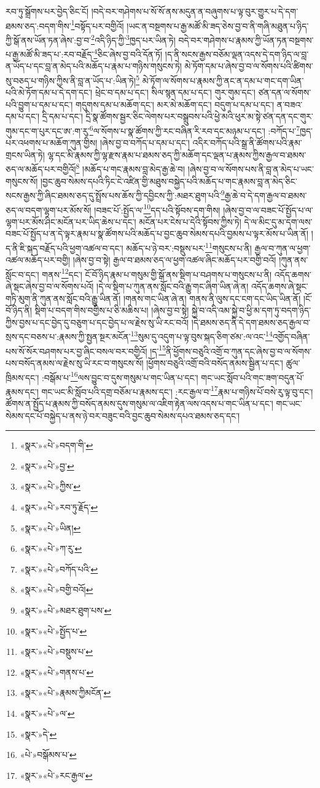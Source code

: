 རབ་ཏུ་སྒྲོགས་པར་བྱེད་ཅིང་ངོ། །བདེ་བར་གཤེགས་པ་སོ་སོ་ནས་མདུན་ན་བཞུགས་པ་ལྟ་བུར་གྱུར་པ་དེ་དག་ཐམས་ཅད་:བདག་གིས་\footnote{«སྣར་»«པེ་»བདག་གི་}བསྟོད་པར་བགྱིའོ། །ཡང་ན་བསྔགས་པ་རྒྱ་མཚོ་མི་ཟད་ཅེས་བྱ་བ་ནི་གཞི་མཐུན་པ་ཉིད་ཀྱི་སྒོ་ནས་ཡོན་ཏན་ཞེས་:བྱ་བ་\footnote{«སྣར་»«པེ་»བྱ་}འདི་ཉིད་ཀྱི་\footnote{«སྣར་»«པེ་»ཀྱིས་}ཁྱད་པར་ཡིན་ཏེ། བདེ་བར་གཤེགས་པ་རྣམས་ཀྱི་ཡོན་ཏན་བསྔགས་པ་རྒྱ་མཚོ་མི་ཟད་པ་:རབ་བརྗོད་\footnote{«སྣར་»«པེ་»རབ་ཏུ་རྗོད་}ཅིང་ཞེས་བྱ་བའི་དོན་ཏོ། །ད་ནི་སངས་རྒྱས་བཅོམ་ལྡན་འདས་དེ་དག་ཉིད་ལ་བླ་ན་ཡོད་པ་དང་བླ་ན་མེད་པའི་མཆོད་པ་རྣམ་པ་གཉིས་གསུངས་ཏེ། མེ་ཏོག་དམ་པ་ཞེས་བྱ་བ་ལ་སོགས་པའི་ཚིགས་སུ་བཅད་པ་གཉིས་ཀྱིས་ནི་བླ་ན་ཡོད་པ་:ཡིན་ཏེ།\footnote{«སྣར་»«པེ་»ཡིན།} མེ་ཏོག་ལ་སོགས་པ་རྣམས་ཀྱི་ནང་ན་དམ་པ་གང་དག་ཡིན་པའི་མེ་ཏོག་དམ་པ་དེ་དག་དང་། ཕྲེང་བ་དམ་པ་དང་། སིལ་སྙན་དམ་པ་དང་། གུར་གུམ་དང་། ཙན་དན་ལ་སོགས་པའི་བྱུག་པ་དམ་པ་དང་། གདུགས་དམ་པ་མཆོག་དང་། མར་མེ་མཆོག་དང་། བདུག་པ་དམ་པ་དང་། ན་བཟའ་དམ་པ་དང་། དྲི་དམ་པ་དང་། དྲི་སྣ་ཚོགས་སྦྱར་ཅིང་ལེགས་པར་བསྒྲུབས་པའི་ཕྱེ་མའི་ཕུར་མ་སྟེ་ཙན་དན་དང་གུར་གུམ་དང་ག་པུར་དང་ཨ་:ག་རུ་\footnote{«སྣར་»«པེ་»ཀ་རུ་}ལ་སོགས་པ་སྣ་ཚོགས་ཀྱི་རང་བཞིན་རི་རབ་དང་མཉམ་པ་དང་། :བཀོད་པ་\footnote{«སྣར་»«པེ་»བཀོད་པའི་}ཁྱད་པར་འཕགས་པ་མཆོག་ཀུན་གྱིས། །ཞེས་བྱ་བ་བཀོད་པ་དམ་པ་དང་། འདིར་བཀོད་པའི་སྒྲ་ནི་ཚོགས་པའི་རྣམ་གྲངས་ཡིན་ཏེ། ལྷ་དང་མི་རྣམས་ཀྱི་ལྷ་རྫས་རྣམ་པ་ཐམས་ཅད་ཀྱི་མཆོག་དང་ལྡན་པ་རྣམས་ཀྱིས་རྒྱལ་བ་ཐམས་ཅད་ལ་མཆོད་པར་བགྱིའོ།\footnote{«སྣར་»«པེ་»བགྱི་བའོ།} །མཆོད་པ་གང་རྣམས་བླ་མེད་རྒྱ་ཆེ་བ། །ཞེས་བྱ་བ་ལ་སོགས་པས་ནི་བླ་ན་མེད་པ་ཡང་གསུངས་སོ། །བྱང་ཆུབ་སེམས་དཔའི་ཏིང་ངེ་འཛིན་གྱི་མཐུས་བསྐྱེད་པའི་མཆོད་པ་གང་རྣམས་བླ་ན་མེད་ཅིང་སངས་རྒྱས་ཀྱི་ཞིང་ཐམས་ཅད་དུ་སྤྲོས་པས་ཆོས་ཀྱི་དབྱིངས་ཀྱི་:མཐར་ཐུག་པའི་\footnote{«སྣར་»«པེ་»མཐར་ཐུག་པས་}རྒྱ་ཆེ་བ་དེ་དག་རྒྱལ་བ་ཐམས་ཅད་ལ་བདག་ལྷག་པར་མོས་སོ། །བཟང་པོ་:སྤྱོད་ལ་\footnote{«སྣར་»«པེ་»སྤྱོད་པ་}དད་པའི་སྟོབས་དག་གིས། །ཞེས་བྱ་བ་ལ་བཟང་པོ་སྤྱོད་པ་ལ་ལྷག་པར་མོས་ཤིང་མངོན་པར་ཡིད་ཆེས་པ་དང་། མངོན་པར་ངེས་པ་དེའི་སྟོབས་ཀྱིས་ཏེ། དེ་ལ་མིང་དུ་མ་དག་ལས་བཟང་པོ་སྤྱོད་པ་ན་དེ་ལྟར་རྣམ་པ་སྣ་ཚོགས་པའི་མཆོད་པ་བྱང་ཆུབ་སེམས་དཔའི་བྱམས་པ་ལྟར་མོས་པ་ཡིན་ནོ། །ད་ནི་ཇི་སྐད་བརྗོད་པའི་ཕྱག་འཚལ་བ་དང་། མཆོད་པ་ཉེ་བར་:བསྡུས་པར་\footnote{«སྣར་»«པེ་»བསྡུས་པ་}གསུངས་པ་ནི། རྒྱལ་བ་ཀུན་ལ་ཕྱག་འཚལ་མཆོད་པར་བགྱི། །ཞེས་བྱ་བ་སྟེ། རྒྱལ་བ་ཐམས་ཅད་ལ་ཕྱག་འཚལ་ཞིང་མཆོད་པར་བགྱི་བའོ། །ཀུན་ནས་སློང་བ་དང་། གནས་\footnote{«སྣར་»«པེ་»གནས་པ་}དང་། ངོ་བོ་ཉིད་རྣམ་པ་གསུམ་གྱི་སྒོ་ནས་སྡིག་པ་བཤགས་པ་གསུངས་པ་ནི། འདོད་ཆགས་ཞེ་སྡང་ཞེས་བྱ་བ་ལ་སོགས་པའོ། །དེ་ལ་སྡིག་པ་ཀུན་ནས་སློང་བའི་རྒྱུ་གང་ཞིག་ཡིན་ཞེ་ན། འདོད་ཆགས་ཞེ་སྡང་གཏི་མུག་ནི་ཀུན་ནས་སློང་བའི་རྒྱུ་ཡིན་ནོ། །གནས་གང་ཡིན་ཞེ་ན། གནས་ནི་ལུས་དང་ངག་དང་ཡིད་ཡིན་ནོ། །ངོ་བོ་ཉིད་ནི། སྡིག་པ་བདག་གིས་བགྱིས་པ་ཅི་མཆིས་པ། །ཞེས་བྱ་བ་སྟེ། སྐྱེ་བ་འདི་འམ་སྐྱེ་བ་ཕྱི་མ་དག་ཏུ་བདག་ཉིད་ཀྱིས་བྱས་པ་དང་བྱེད་དུ་བཅུག་པ་དང་བྱེད་པ་ལ་རྗེས་སུ་ཡི་རང་བའོ། །དེ་ཐམས་ཅད་ནི་དེ་དག་ཐམས་ཅད་རྒྱལ་བ་སྲས་དང་བཅས་པ་:རྣམས་ཀྱི་སྤྱན་སྔར་མངོན་\footnote{«སྣར་»«པེ་»རྣམས་ཀྱིམངོན་}སུམ་དུ་འདུག་པ་ལྟ་བུས་སྐད་ཅིག་ཙམ་:ལ་འང་\footnote{«སྣར་»«པེ་»ལ་}འགྱོད་བཞིན་པས་སོ་སོར་བཤགས་པར་བྱ་ཞིང་བསལ་བར་བགྱིའོ། །ད་\footnote{«སྣར་»དེ་}ནི་ཕྱོགས་བཅུའི་འགྲོ་བ་ཀུན་དང་ཞེས་བྱ་བ་ལ་སོགས་པས་བསོད་ནམས་ལ་རྗེས་སུ་ཡི་རང་བ་གསུངས་སོ། །ཕྱོགས་བཅུའི་འགྲོ་བའི་བསོད་ནམས་སྦྱིན་པ་དང་། ཚུལ་ཁྲིམས་དང་། :བསྒོམ་པ་\footnote{«པེ་»བསྒོམས་པ་}ལས་བྱུང་བ་དུས་གསུམ་པ་གང་ཡིན་པ་དང་། གང་ཡང་སློབ་པའི་གང་ཟག་བདུན་པོ་རྣམས་དང་། གང་ཡང་མི་སློབ་པའི་དགྲ་བཅོམ་པ་རྣམས་དང་། :རང་རྒྱལ་བ་\footnote{«སྣར་»«པེ་»རང་རྒྱལ་}རྣམ་པ་གཉིས་པོ་བསེ་རུ་ལྟ་བུ་དང་། ཚོགས་ན་སྤྱོད་པ་རྣམས་ཀྱི་བསོད་ནམས་དུས་གསུམ་ལ་འཇིག་རྟེན་ལས་འདས་པ་གང་ཡིན་པ་དང་། གང་ཡང་སེམས་དང་པོ་བསྐྱེད་པ་ནས་ཉེ་བར་བཟུང་བའི་བྱང་ཆུབ་སེམས་དཔའ་ཐམས་ཅད་དང་། 